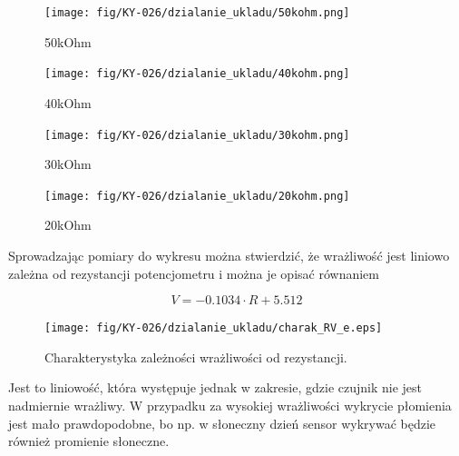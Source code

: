\documentclass[11pt, a4paper]{article}
\begin{document}
\vspace{0.5cm}
\begin{figure}[h!]
  \centering
  \texttt{[image: fig/KY-026/dzialanie\_ukladu/50kohm.png]}
    \caption{50kOhm}
    \label{sch}
\end{figure}

\vspace{0.5cm}

\begin{figure}[h!]
  \centering
  \texttt{[image: fig/KY-026/dzialanie\_ukladu/40kohm.png]}
    \caption{40kOhm}
    \label{sch}
\end{figure}

\vspace{0.5cm}

\begin{figure}[h!]
  \centering
  \texttt{[image: fig/KY-026/dzialanie\_ukladu/30kohm.png]}
    \caption{30kOhm}
    \label{sch}
\end{figure}

\vspace{0.5cm}

\begin{figure}[h!]
  \centering
  \texttt{[image: fig/KY-026/dzialanie\_ukladu/20kohm.png]}
    \caption{20kOhm}
    \label{sch}
\end{figure}
\clearpage

Sprowadzając pomiary do wykresu można stwierdzić, że wrażliwość jest liniowo zależna od rezystancji potencjometru i można je opisać równaniem

\[
V = -0.1034 \cdot R + 5.512
\] 

\begin{figure}[h!]
  \centering
  \texttt{[image: fig/KY-026/dzialanie\_ukladu/charak\_RV\_e.eps]}
    \caption{Charakterystyka zależności wrażliwości od rezystancji.}
    \label{sch}
\end{figure}

Jest to liniowość, która występuje jednak w zakresie, gdzie czujnik nie jest nadmiernie wrażliwy. W przypadku za wysokiej wrażliwości wykrycie płomienia jest mało prawdopodobne, bo np. w słoneczny dzień sensor wykrywać będzie również promienie słoneczne. 
\clearpage
\printbibliography[heading=bibintoc]
\end{document}
